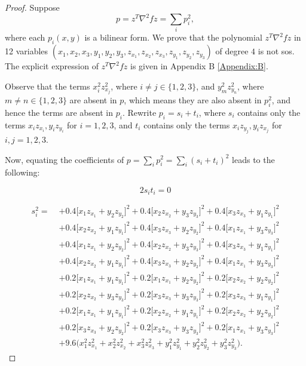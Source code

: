 \documentclass[12pt]{elsarticle}
\theoremstyle{definition}
\begin{document}
\begin{proof}

Suppose 
\[
p = z^T \nabla^2 f z = \sum_i p_i^2,
\]
where each $p_i(x,y)$ is a bilinear form. We prove that the polynomial $z^T \nabla^2 f z$ in 12 variables $(x_1,x_2,x_3,y_1,y_2,y_3,z_{x_1},z_{x_2},z_{x_3},z_{y_1},z_{y_2},z_{y_3})$ of degree $4$ is not sos. The explicit expression of $z^T \nabla^2 f z$ is given in Appendix B \ref{Appendix:B}.

Observe that the terms $x_i^2 z_{x_j}^{2}$, where $i\neq j \in \{1,2,3\}$, and $y_m^2 z_{y_n}^{2}$, where $m\neq n \in \{1,2,3\}$ are absent in $p$, which means they are also absent in $p_i^2$, and hence the terms are absent in $p_i$. Rewrite $p_i = s_i + t_i$, where $s_i$ contains only the terms $x_i z_{x_i}, y_i z_{y_i}$ for $i=1,2,3$, and $t_i$ contains only the terms $x_i z_{y_j}, y_iz_{x_j}$ for $i,j =1,2,3$.

Now, equating the coefficients of $p = \sum_i p_i^2 = \sum_i (s_i + t_i)^2$ leads to the following:

\[
    2s_i t_i =0
\]

\begin{align*}
    s_i^2 =\; &+ 0.4\Big[x_1z_{x_1} + y_2z_{y_2}\Big]^2
+ 0.4\Big[x_2z_{x_2} + y_3z_{y_3}\Big]^2
+ 0.4\Big[x_3z_{x_3} + y_1z_{y_1}\Big]^2 \\
&+ 0.4\Big[x_2z_{x_2} + y_1z_{y_1}\Big]^2
+ 0.4\Big[x_3z_{x_3} + y_2z_{y_2}\Big]^2
+ 0.4\Big[x_1z_{x_1} + y_3z_{y_3}\Big]^2 \\
&+ 0.4\Big[x_1z_{x_1} + y_2z_{y_2}\Big]^2
+ 0.4\Big[x_2z_{x_2} + y_3z_{y_3}\Big]^2
+ 0.4\Big[x_3z_{x_3} + y_1z_{y_1}\Big]^2 \\
&+ 0.4\Big[x_2z_{x_2} + y_1z_{y_1}\Big]^2
+ 0.4\Big[x_3z_{x_3} + y_2z_{y_2}\Big]^2
+ 0.4\Big[x_1z_{x_1} + y_3z_{y_3}\Big]^2 \\
&+ 0.2\Big[x_1z_{x_1} + y_1z_{y_1}\Big]^2
+ 0.2\Big[x_1z_{x_1} + y_2z_{y_2}\Big]^2
+ 0.2\Big[x_2z_{x_2} + y_2z_{y_2}\Big]^2 \\
&+ 0.2\Big[x_2z_{x_2} + y_3z_{y_3}\Big]^2
+ 0.2\Big[x_3z_{x_3} + y_3z_{y_3}\Big]^2
+ 0.2\Big[x_3z_{x_3} + y_1z_{y_1}\Big]^2 \\
&+ 0.2\Big[x_1z_{x_1} + y_1z_{y_1}\Big]^2
+ 0.2\Big[x_2z_{x_2} + y_1z_{y_1}\Big]^2
+ 0.2\Big[x_2z_{x_2} + y_2z_{y_2}\Big]^2 \\
&+ 0.2\Big[x_3z_{x_3} + y_2z_{y_2}\Big]^2
+ 0.2\Big[x_3z_{x_3} + y_3z_{y_3}\Big]^2
+ 0.2\Big[x_1z_{x_1} + y_3z_{y_3}\Big]^2 \\
&+ 9.6\Big(x_1^2z_{x_1}^2 + x_2^2z_{x_2}^2 + x_3^2z_{x_3}^2
+ y_1^2z_{y_1}^2 + y_2^2z_{y_2}^2 + y_3^2z_{y_3}^2\Big).
    \end{align*}


\end{proof}
\end{document}
